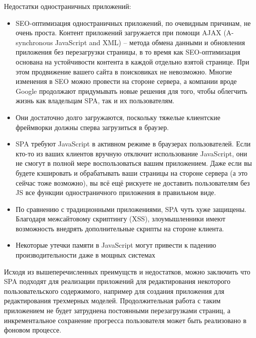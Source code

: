 Недостатки одностраничных приложений:
\begin{itemize}
\item SEO-оптимизация одностраничных приложений, по очевидным причинам, не очень проста. Контент приложений загружается при помощи AJAX (A-synchronous JavaScript and XML) -- метода
 обмена данными и обновления приложения без перезагрузки страницы, в то время как SEO-оптимизация основана на устойчивости контента в каждой отдельно взятой странице. При этом 
 продвижение вашего сайта в поисковиках не невозможно. Многие изменения в SEO можно провести на стороне сервера, а компании вроде Google продолжают придумывать новые решения для
 того, чтобы облегчить жизнь как владельцам SPA, так и их пользователям.
\item Они достаточно долго загружаются, поскольку тяжелые клиентские фреймворки должны сперва загрузиться в браузер.
\item SPA требуют JavaScript в активном режиме в браузерах пользователей. Если кто-то из ваших клиентов вручную отключит использование JavaScript, они не смогут в полной мере
воспользоваться вашим приложением. Даже если вы будете кэшировать и обрабатывать ваши страницы на стороне сервера (а это сейчас тоже возможно), вы всё ещё рискуете не доставить 
пользователям без JS все функции одностраничного приложения в правильном виде.
\item По сравнению с традиционными приложениями, SPA чуть хуже защищены. Благодаря межсайтовому скриптингу (XSS), злоумышленники имеют возможность внедрять дополнительные 
скрипты на стороне клиента.
\item Некоторые утечки памяти в JavaScript могут привести к падению производительности даже в мощных системах
 \end{itemize}

Исходя из вышеперечисленных преимущств и недостатков, можно заключить что SPA подходят для реализации приложений для редактирования некоторого пользовательского содержимого,
например для создания приложения для редактирования трехмерных моделей. Продолжительная работа с таким приложением не будет затруднена постоянными перезагрузками страниц, а
инкрементальное сохранение прогресса пользователя может быть реализовано в фоновом процессе.
